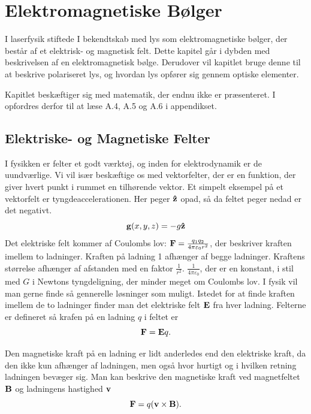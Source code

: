 \chapter{Elektromagnetiske Bølger}

I laserfysik stiftede I bekendtskab med lys som elektromagnetiske bølger, der består af et elektrisk- og magnetisk felt. Dette kapitel går i dybden med beskrivelsen af en elektromagnetisk bølge. Derudover vil kapitlet bruge denne til at beskrive polariseret lys, og hvordan lys opfører sig gennem optiske elementer. 

Kapitlet beskæftiger sig med matematik, der endnu ikke er præsenteret. I opfordres derfor til at læse A.4, A.5 og A.6 i appendikset. 


\section{Elektriske- og Magnetiske Felter}
I fysikken er felter et godt værktøj, og inden for elektrodynamik er de uundværlige. Vi vil især beskæftige os med vektorfelter, der er en funktion, der giver hvert punkt i rummet en tilhørende vektor. Et simpelt eksempel på et vektorfelt er tyngdeaccelerationen. Her peger $\mathbf{\hat{z}}$ opad, så da feltet peger nedad er det negativt.
\begin{equation}
\mathbf{g}(x,y,z) = -g\mathbf{\hat{z}}
\end{equation}
Det elektriske felt kommer af Coulombs lov: $\mathbf{F} = \frac{q_1q_2}{4\pi\varepsilon_0r^2}$, der beskriver kraften imellem to ladninger. Kraften på ladning 1 afhænger af begge ladninger. Kraftens størrelse afhænger af afstanden med en faktor $\frac{1}{r^2}$. $\frac{1}{4\pi\varepsilon_0}$, der er en konstant, i stil med $G$ i Newtons tyngdeligning, der minder meget om Coulombs lov. I fysik vil man gerne finde så gennerelle løsninger som muligt. Istedet for at finde kraften imellem de to ladninger finder man det elektriske felt $\mathbf{E}$ fra hver ladning. Felterne er defineret så krafen på en ladning $q$ i feltet er 
\begin{equation}
\mathbf{F}=\mathbf{E}q.
\end{equation} 

Den magnetiske kraft på en ladning er lidt anderledes end den elektriske kraft, da den ikke kun afhænger af ladningen, men også hvor hurtigt og i hvilken retning ladningen bevæger sig. Man kan beskrive den magnetiske kraft ved magnetfeltet $\mathbf{B}$ og ladningens hastighed $\mathbf{v}$
\begin{equation}
\mathbf{F} = q(\mathbf{v}\times\mathbf{B}).
\end{equation}
 

